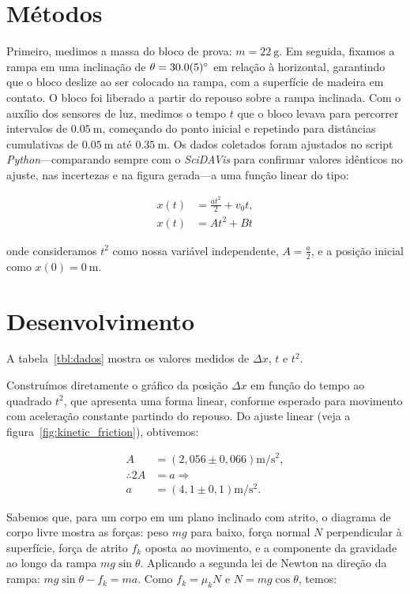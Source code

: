 \documentclass[10pt,oneside,twocolumn,a4paper]{article}
\begin{document}
\section{Métodos}

Primeiro, medimos a massa do bloco de prova: $m = \SI{22}{\gram}$. Em seguida,
fixamos a rampa em uma inclinação de $\theta = \SI{30 \pm 0.5}{\degree}$ em
relação à horizontal, garantindo que o bloco deslize ao ser colocado na rampa,
com a superfície de madeira em contato. O bloco foi liberado a partir do
repouso sobre a rampa inclinada. Com o auxílio dos sensores de luz, medimos o
tempo $t$ que o bloco levava para percorrer intervalos de $\SI{0.05}{\metre}$,
começando do ponto inicial e repetindo para distâncias cumulativas de
$\SI{0,05}{\metre}$ até $\SI{0.35}{\metre}$. Os dados coletados foram ajustados
no script \textit{Python}---comparando sempre com o \textit{SciDAVis} para
confirmar valores idênticos no ajuste, nas incertezas e na figura gerada---a
uma função linear do tipo:

\begin{align*}
	x(t) &= \frac{at^2}{2} + v_0t, \\
	x(t) &= At^2 + Bt
\end{align*}

onde consideramos $t^2$ como nossa variável independente, $A = \frac{a}{2}$, e
a posição inicial como $x(0) = \SI{0}{\meter}$.

\section{Desenvolvimento}

A tabela~\ref{tbl:dados} mostra os valores medidos de $\Delta x$, $t$ e
$t^2$.

Construímos diretamente o gráfico da posição $\Delta x$ em função do tempo ao
quadrado $t^2$, que apresenta uma forma linear, conforme esperado para movimento
com aceleração constante partindo do repouso. Do ajuste linear
(veja a figura~\ref{fig:kinetic_friction}), obtivemos:

\begin{align}\label{eq:accel}
	A &= \left( 2,056 \pm 0,066 \right) \si{\metre\per\second\squared}, \nonumber \\
	\therefore 2A &= a \Rightarrow \nonumber \\
	a &= \left( 4,1 \pm 0,1 \right) \si{\metre\per\second\squared}.
\end{align}

Sabemos que, para um corpo em um plano inclinado com atrito, o diagrama de
corpo livre mostra as forças: peso $mg$ para baixo, força normal $N$
perpendicular à superfície, força de atrito $f_k$ oposta ao movimento, e a
componente da gravidade ao longo da rampa $mg \sin\theta$. Aplicando a segunda
lei de Newton na direção da rampa: $mg \sin\theta - f_k = ma$. Como $f_k =
\mu_k N$ e $N = mg \cos\theta$, temos:
\end{document}
